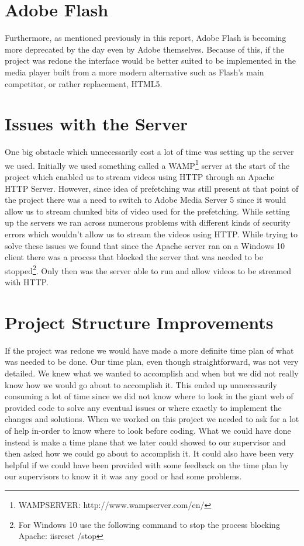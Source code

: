 \section{Adobe Flash}
\label{sec:adobe flash}

Furthermore, as mentioned previously in this report, Adobe Flash is becoming more deprecated by the day even by Adobe themselves. Because of this, if the project was redone the interface would be better suited to be implemented in the media player built from a more modern alternative such as Flash’s main competitor, or rather replacement, HTML5.

\section{Issues with the Server}
\label{sec:serverissues}

One big obstacle which unnecessarily cost a lot of time was setting up the server we used. Initially we used something called a WAMP\footnote{WAMPSERVER: http://www.wampserver.com/en/} server at the start of the project which enabled us to stream videos using HTTP through an Apache HTTP Server. However, since idea of prefetching was still present at that point of the project there was a need to switch to Adobe Media Server 5 since it would allow us to stream chunked bits of video used for the prefetching. While setting up the servers we ran across numerous problems with different kinds of security errors which wouldn’t allow us to stream the videos using HTTP. While trying to solve these issues we found that since the Apache server ran on a Windows 10 client there was a process that blocked the server that was needed to be stopped\footnote{For Windows 10 use the following command to stop the process blocking Apache: iisreset /stop}. Only then was the server able to run and allow videos to be streamed with HTTP.

\section{Project Structure Improvements}
\label{sec:psi}

If the project was redone we would have made a more definite time plan of what was needed to be done. Our time plan, even though straightforward, was not very detailed. We knew what we wanted to accomplish and when but we did not really know how we would go about to accomplish it. This ended up unnecessarily consuming a lot of time since we did not know where to look in the giant web of provided code to solve any eventual issues or where exactly to implement the changes and solutions. When we worked on this project we needed to ask for a lot of help in-order to know where to look before coding. What we could have done instead is make a time plane that we later could showed to our supervisor and then asked how we could go about to accomplish it. It could also have been very helpful if we could have been provided with some feedback on the time plan by our supervisors to know it it was any good or had some problems. 

